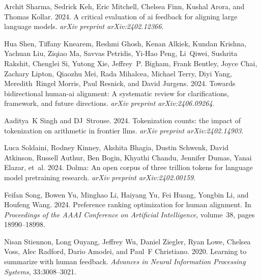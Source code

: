 \documentclass[11pt]{article}
\begin{document}
\begin{thebibliography}{88}
    Archit Sharma, Sedrick Keh, Eric Mitchell, Chelsea Finn, Kushal Arora, and Thomas Kollar. 2024.
    \newblock A critical evaluation of ai feedback for aligning large language models.
    \newblock \emph{arXiv preprint arXiv:2402.12366}.
    
    Hua Shen, Tiffany Knearem, Reshmi Ghosh, Kenan Alkiek, Kundan Krishna, Yachuan Liu, Ziqiao Ma, Savvas Petridis, Yi-Hao Peng, Li~Qiwei, Sushrita Rakshit, Chenglei Si, Yutong Xie, Jeffrey~P. Bigham, Frank Bentley, Joyce Chai, Zachary Lipton, Qiaozhu Mei, Rada Mihalcea, Michael Terry, Diyi Yang, Meredith~Ringel Morris, Paul Resnick, and David Jurgens. 2024.
    \newblock Towards bidirectional human-ai alignment: A systematic review for clarifications, framework, and future directions.
    \newblock \emph{arXiv preprint arXiv:2406.09264}.
    
    Aaditya~K Singh and DJ~Strouse. 2024.
    \newblock Tokenization counts: the impact of tokenization on arithmetic in frontier llms.
    \newblock \emph{arXiv preprint arXiv:2402.14903}.
    
    Luca Soldaini, Rodney Kinney, Akshita Bhagia, Dustin Schwenk, David Atkinson, Russell Authur, Ben Bogin, Khyathi Chandu, Jennifer Dumas, Yanai Elazar, et~al. 2024.
    \newblock Dolma: An open corpus of three trillion tokens for language model pretraining research.
    \newblock \emph{arXiv preprint arXiv:2402.00159}.
    
    Feifan Song, Bowen Yu, Minghao Li, Haiyang Yu, Fei Huang, Yongbin Li, and Houfeng Wang. 2024.
    \newblock Preference ranking optimization for human alignment.
    \newblock In \emph{Proceedings of the AAAI Conference on Artificial Intelligence}, volume~38, pages 18990--18998.
    
    Nisan Stiennon, Long Ouyang, Jeffrey Wu, Daniel Ziegler, Ryan Lowe, Chelsea Voss, Alec Radford, Dario Amodei, and Paul~F Christiano. 2020.
    \newblock Learning to summarize with human feedback.
    \newblock \emph{Advances in Neural Information Processing Systems}, 33:3008--3021.
    

\end{thebibliography}
\end{document}
